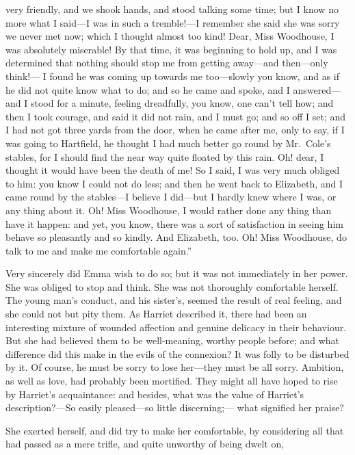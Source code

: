 very friendly, and we shook hands, and stood talking some time;
but I know no more what I said---I was in such a tremble!---I remember
she said she was sorry we never met now; which I thought almost
too kind!  Dear, Miss Woodhouse, I was absolutely miserable!
By that time, it was beginning to hold up, and I was determined
that nothing should stop me from getting away---and then---only think!---%
I found he was coming up towards me too---slowly you know, and as
if he did not quite know what to do; and so he came and spoke,
and I answered---and I stood for a minute, feeling dreadfully,
you know, one can't tell how; and then I took courage, and said it
did not rain, and I must go; and so off I set; and I had not got
three yards from the door, when he came after me, only to say,
if I was going to Hartfield, he thought I had much better go round
by Mr.\ Cole's stables, for I should find the near way quite floated
by this rain.  Oh! dear, I thought it would have been the death of me!
So I said, I was very much obliged to him:  you know I could
not do less; and then he went back to Elizabeth, and I came round
by the stables---I believe I did---but I hardly knew where I was,
or any thing about it.  Oh!  Miss Woodhouse, I would rather done
any thing than have it happen:  and yet, you know, there was a sort
of satisfaction in seeing him behave so pleasantly and so kindly.
And Elizabeth, too.  Oh!  Miss Woodhouse, do talk to me and make
me comfortable again.''

Very sincerely did Emma wish to do so; but it was not immediately in
her power.  She was obliged to stop and think.  She was not thoroughly
comfortable herself.  The young man's conduct, and his sister's,
seemed the result of real feeling, and she could not but pity them.
As Harriet described it, there had been an interesting mixture
of wounded affection and genuine delicacy in their behaviour.
But she had believed them to be well-meaning, worthy people before;
and what difference did this make in the evils of the connexion?
It was folly to be disturbed by it.  Of course, he must be sorry
to lose her---they must be all sorry.  Ambition, as well as love,
had probably been mortified.  They might all have hoped to rise
by Harriet's acquaintance:  and besides, what was the value of
Harriet's description?---So easily pleased---so little discerning;---%
what signified her praise?

She exerted herself, and did try to make her comfortable,
by considering all that had passed as a mere trifle, and quite
unworthy of being dwelt on,

